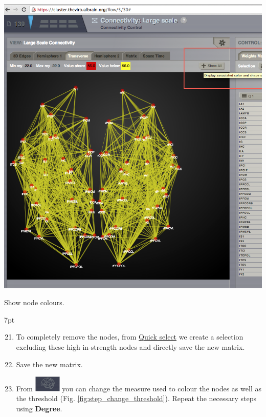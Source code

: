 \documentclass{tufte-handout}
\newenvironment{formal}{%
  \def\FrameCommand{%
    \hspace{1pt}%
    {\color{DarkBlue}\vrule width 2pt}%
    {\color{formalshade}\vrule width 4pt}%
    \colorbox{formalshade}%
  }%
  \MakeFramed{\advance\hsize-\width\FrameRestore}%
  \noindent\hspace{-4.55pt}%
  \begin{adjustwidth}{}{7pt}%
  \vspace{2pt}\vspace{2pt}%
}
{%
  \vspace{2pt}\end{adjustwidth}\endMakeFramed%
}
\begin{document}
\begin{marginfigure}
  \includegraphics[width=0.9\linewidth]{Handout_UI_ModellingStructuralLesions_ShowColourNodes}%
  \caption{Show node colours.}%
  \label{fig:step_12}%
\end{marginfigure}

\begin{formal}
  \begin{enumerate}[resume] %
  \setcounter{enumi}{20}
\item To completely remove the nodes, from \underline{Quick select} we create a selection excluding these high in-strength nodes and directly save the new matrix. 
\item Save the new matrix.
\item From \includegraphics[width=0.1\textwidth]{butt_brain_menu} 
 you can change the measure used to colour the nodes as well as the threshold  (Fig. \ref{fig:step_change_threshold}). Repeat the necessary steps using \textbf{Degree}. 

  \end{enumerate}
\end{formal}
\end{document}
